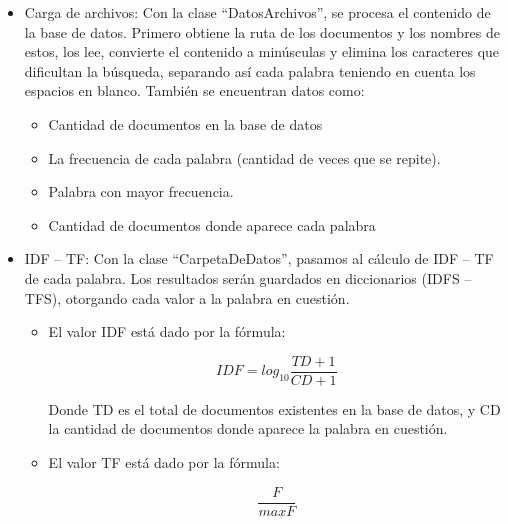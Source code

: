 \documentclass[a4paper, 12pt]{article}
\begin{document}
\begin{itemize}
\item Carga de archivos:
Con la clase “DatosArchivos”, se procesa el contenido de la base de datos. Primero obtiene 
la ruta de los documentos y los nombres de estos, los lee, convierte el contenido a 
minúsculas y elimina los caracteres que dificultan la búsqueda, separando así cada palabra 
teniendo en cuenta los espacios en blanco.
También se encuentran datos como:
		\begin{itemize}
\item Cantidad de documentos en la base de datos
\item La frecuencia de cada palabra (cantidad de veces que se repite).
\item  Palabra con mayor frecuencia.
\item Cantidad de documentos donde aparece cada palabra
		\end{itemize}
\item IDF – TF:
Con la clase “CarpetaDeDatos”, pasamos al cálculo de IDF – TF de cada palabra. Los 
resultados serán guardados en diccionarios (IDFS – TFS), otorgando cada valor a la palabra 
en cuestión.
		\begin{itemize}
\item El valor IDF está dado por la fórmula:
	\begin{center}
		$$
			IDF=log_{10}{\frac{TD+1}{CD+1}}
		$$
	\end{center} 
Donde TD es el total de documentos existentes en la base de datos, y CD la cantidad de 
documentos donde aparece la palabra en cuestión.
\item El valor TF está dado por la fórmula:
	\begin{center}
		$$
			\frac{F}{maxF}
		$$
	\end{center}


\end{itemize}
\end{itemize}
\end{document}
